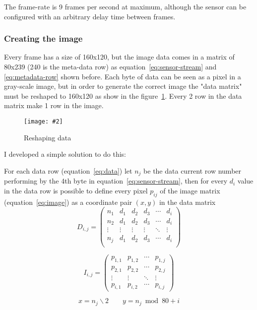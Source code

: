 \documentclass[hidelinks,11pt,a4paper,oneside,article]{memoir}
\newcommand{\putimage}[3][10] %
{
\begin{figure}[h]
	\centering
	\captionsetup{justification=centering}
	\texttt{[image: \#2]}
	\caption{#3}
	\label{fig:#2}
\end{figure}
}
\begin{document}
The frame-rate is 9 frames per second at maximum, although the sensor can be configured with an arbitrary delay time between frames.

\subsubsection{Creating the image}\label{creatingimage}
Every frame has a size of 160x120, but the image data comes in a matrix of 80x239 (240 is the meta-data row) as equation~\ref{eq:sensor-stream} and \ref{eq:metadata-row} shown before. Each byte of data can be seen as a pixel in a gray-scale image, but in order to generate the correct image the "data matrix" must be reshaped to 160x120 as show in the figure~\ref{fig:sensor-image}. Every 2 row in the data matrix make 1 row in the image.
\putimage{sensor-image}{Reshaping data}

I developed a simple solution to do this:

For each data row (equation~\ref{eq:data}) let $n_j$ be the data current row number performing by the 4th byte in equation~\ref{eq:sensor-stream}, then for every $d_i$ value in the data row is possible to define every pixel $p_{ij}$ of the image matrix (equation~\ref{eq:image}) as a coordinate pair $(x,y)$ in the data matrix 
\begin{equation}
\label{eq:data}
D_{i,j} = 
\begin{pmatrix}
n_1 & d_1 & d_2 & d_3 & \cdots & d_i\\
n_2 & d_1 & d_2 & d_3 & \cdots & d_i\\
\vdots & \vdots & \vdots& \vdots  & \ddots & \vdots  \\
n_j & d_1 & d_2 & d_3 & \cdots & d_i\\
\end{pmatrix}
\end{equation}

\begin{equation}
\label{eq:image}
I_{i,j} = 
\begin{pmatrix}
    p_{1,1} & p_{1,2} & \cdots & p_{1,j} \\
    p_{2,1} & p_{2,2} & \cdots & p_{2,j} \\
    \vdots  & \vdots  & \ddots & \vdots  \\
    p_{i,1} & p_{i,2} & \cdots & p_{i,j} 
\end{pmatrix}
\end{equation}

\begin{equation}
\label{eq:coordinate}
x = n_j \backslash 2  \qquad y = n_j \bmod 80 + i
\end{equation}
\end{document}
